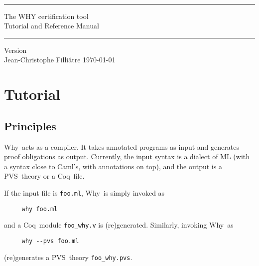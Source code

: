 \documentclass[a4paper,12pt]{report}
\newcommand{\caml}{\textsf{Caml}}
\newcommand{\pvs}{\textsf{PVS}}
\newcommand{\coq}{\textsf{Coq}}
\newcommand{\why}{\textsf{Why}}
\begin{document}
\thispagestyle{empty}
\begin{center}
~\\[3cm]
\rule\textwidth{0.1cm}\\[0.5cm]
{\Huge\sf The WHY certification tool}\\[1cm]
{\Large\sf Tutorial and Reference Manual}\\[0.1cm]
\rule\textwidth{0.1cm}\\[1cm]
Version \whyversion\\[3cm]
Jean-Christophe Filli\^atre
\vfill
\today\\
\end{center}


\tableofcontents





\chapter{Tutorial}
\label{tutorial}


\section{Principles}

\why\ acts as a compiler. It takes annotated programs as input and
generates proof obligations as output.
Currently, the input syntax is a dialect of ML (with a syntax close to
\caml's, with annotations on top),
and the output is a \pvs\ theory or a \coq\ file.

If the input file is \texttt{foo.ml}, \why\ is simply invoked as
\begin{verbatim}
     why foo.ml
\end{verbatim}
and a \coq\ module \texttt{foo\_why.v} is (re)generated.
Similarly, invoking \why\ as
\begin{verbatim}
     why --pvs foo.ml
\end{verbatim}
(re)generates a \pvs\ theory \texttt{foo\_why.pvs}.
\end{document}
